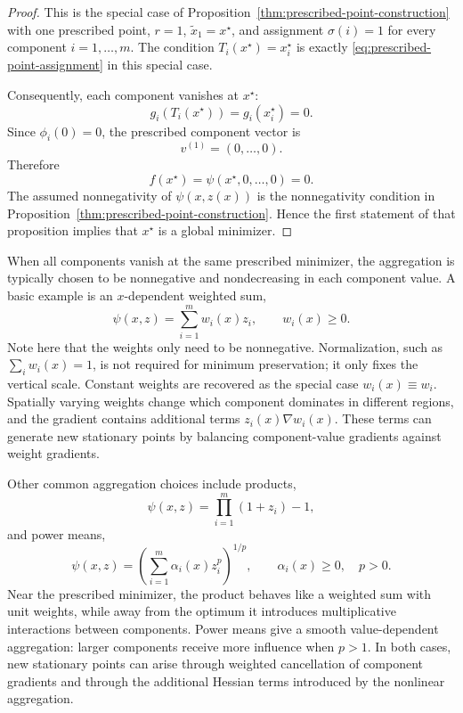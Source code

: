 \documentclass[journal]{IEEEtran}
\theoremstyle{remark}
\theoremstyle{plain}
\begin{document}
\begin{proof}
	This is the special case of
	Proposition~\ref{thm:prescribed-point-construction} with one prescribed
	point, \(r=1\), \(\tilde x_1=x^\star\), and assignment
	\(\sigma(i)=1\) for every component \(i=1,\ldots,m\). The condition
	\(T_i(x^\star)=x_i^\star\) is exactly
	\eqref{eq:prescribed-point-assignment} in this special case.
	
	Consequently, each component vanishes at \(x^\star\):
	\[
	g_i(T_i(x^\star))=g_i(x_i^\star)=0.
	\]
	Since \(\phi_i(0)=0\), the prescribed component vector is
	\[
	v^{(1)}=(0,\ldots,0).
	\]
	Therefore
	\[
	f(x^\star)=\psi(x^\star,0,\ldots,0)=0.
	\]
	The assumed nonnegativity of \(\psi(x,z(x))\) is the nonnegativity condition
	in Proposition~\ref{thm:prescribed-point-construction}. Hence the first
	statement of that proposition implies that \(x^\star\) is a global minimizer.
\end{proof}

When all components vanish at the same prescribed minimizer, the aggregation is
typically chosen to be nonnegative and nondecreasing in each component value. A
basic example is an \(x\)-dependent weighted sum,
\[
	\psi(x,z)=\sum_{i=1}^m w_i(x)z_i,
	\qquad
	w_i(x)\ge0.
\]
Note here that the weights only
need to be nonnegative. Normalization, such as \(\sum_i w_i(x)=1\), is not
required for minimum preservation; it only fixes the vertical scale. Constant
weights are recovered as the special case \(w_i(x)\equiv w_i\). Spatially
varying weights change which component dominates in different regions, and the
gradient contains additional terms \(z_i(x)\nabla w_i(x)\). These terms can
generate new stationary points by balancing component-value gradients against
weight gradients.

Other common aggregation choices include products,
\[
	\psi(x, z)=\prod_{i=1}^m(1+z_i)-1,
\]
and power means,
\[
	\psi(x,z)=
	\left(
	\sum_{i=1}^m \alpha_i(x) z_i^p
	\right)^{1/p},
	\qquad
	\alpha_i(x)\ge0,
	\quad
	p>0.
\]
Near the prescribed minimizer, the product behaves like a weighted sum with unit
weights, while away from the optimum it introduces multiplicative interactions
between components. Power means give a smooth value-dependent aggregation:
larger components receive more influence when \(p>1\). In both cases, new
stationary points can arise through weighted cancellation of component
gradients and through the additional Hessian terms introduced by the nonlinear
aggregation.
\end{document}

